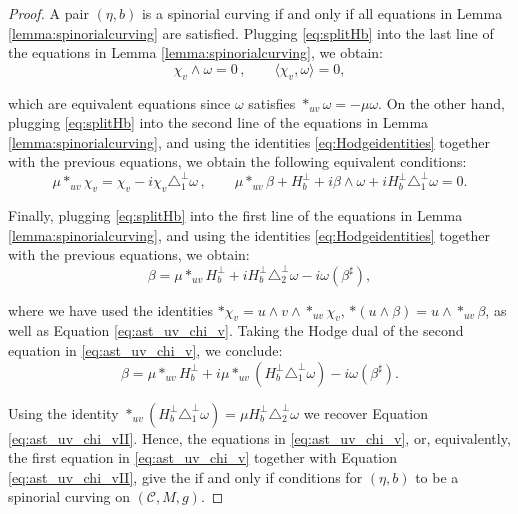 \documentclass[10pt,a4paper,twoside,reqno]{amsart}
\theoremstyle{plain}
\theoremstyle{definition}
\theoremstyle{remark}
\def\cC{{\mathcal C}}
\def\cC{\mathcal{C}}
\begin{document}
\begin{proof}
A pair $(\eta,b)$ is a spinorial curving if and only if all equations in Lemma \ref{lemma:spinorialcurving} are satisfied. Plugging \eqref{eq:splitHb} into the last line of the equations in Lemma \ref{lemma:spinorialcurving}, we obtain:
\begin{equation*}
\chi_v  \wedge \omega = 0 \, , \qquad  \langle \chi_v , \omega \rangle = 0,
\end{equation*}

\noindent
which are equivalent equations since $\omega$ satisfies $\ast_{uv} \omega = -\mu \omega$. On the other hand, plugging \eqref{eq:splitHb} into the second line of the equations in Lemma \ref{lemma:spinorialcurving}, and using the identities \eqref{eq:Hodgeidentities} together with the previous equations, we obtain the following equivalent conditions:
\begin{equation}
\label{eq:ast_uv_chi_v}
\mu \ast_{uv} \chi_v = \chi_v  - i \chi_v \triangle_1^{\perp} \omega\, , \qquad \mu \ast_{uv}\beta + H_b^\perp + i\beta\wedge\omega + i H_b^\perp\triangle_1^\perp\omega = 0.
\end{equation}

\noindent
Finally, plugging \eqref{eq:splitHb} into the first line of the equations in Lemma \ref{lemma:spinorialcurving}, and using the identities \eqref{eq:Hodgeidentities} together with the previous equations, we obtain:
\begin{equation}
\label{eq:ast_uv_chi_vII}
\beta = \mu*_{uv}H_b^\perp + iH_b^\perp\triangle_2^\perp\omega - i\omega(\beta^\sharp),
\end{equation}

\noindent
where we have used the identities $\ast\chi_v=u\wedge v\wedge \ast_{uv}\chi_v$, $\ast (u\wedge\beta)=u\wedge \ast_{uv}\beta$, as well as Equation \eqref{eq:ast_uv_chi_v}. Taking the Hodge dual of the second equation in \eqref{eq:ast_uv_chi_v}, we conclude:
\begin{equation*}
\beta = \mu\ast_{uv}H_b^\perp + i \mu \ast_{uv} (H_b^\perp\triangle_1^\perp\omega) - i\omega(\beta^\sharp).
\end{equation*}

\noindent
Using the identity $\ast_{uv} (H_b^\perp\triangle_1^\perp\omega) = \mu H_b^\perp\triangle_2^\perp\omega$ we recover Equation \eqref{eq:ast_uv_chi_vII}. Hence, the equations in \eqref{eq:ast_uv_chi_v}, or, equivalently, the first equation in \eqref{eq:ast_uv_chi_v} together with Equation \eqref{eq:ast_uv_chi_vII}, give the if and only if conditions for $(\eta,b)$ to be a spinorial curving on $(\cC,M,g)$.
\end{proof}
\end{document}
